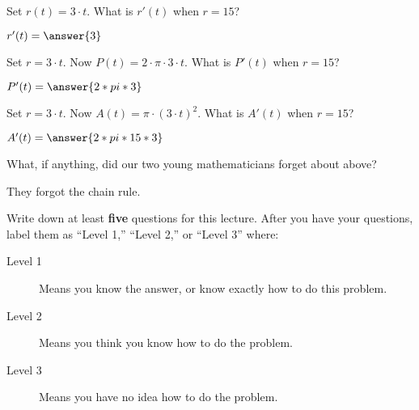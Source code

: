 \documentclass{ximera}
\begin{document}
\begin{problem}
  Set $r(t)=3\cdot t$. What is $r'(t)$ when $r=15$?
  \begin{prompt}
    $r'(t)=\answer{3}$
  \end{prompt}
\end{problem}

\begin{problem}
  Set $r=3\cdot t$. Now $P(t) = 2\cdot \pi\cdot 3\cdot t$. What is
  $P'(t)$ when $r=15$?
  \begin{prompt}
    $P'(t)=\answer{2*pi*3}$
  \end{prompt}
\end{problem}

\begin{problem}
  Set $r=3\cdot t$. Now $A(t) = \pi\cdot (3\cdot t)^2$. What is
  $A'(t)$ when $r=15$?
  \begin{prompt}
    $A'(t)=\answer{2*pi*15*3}$
  \end{prompt}
\end{problem}

\begin{problem}
  What, if anything, did our two young mathematicians forget about above?
  \begin{freeResponse}
 They forgot the chain rule.
  \end{freeResponse}
\end{problem}



\begin{xarmaBoost}
  Write down at least \textbf{five} questions for this lecture. After
  you have your questions, label them as ``Level 1,'' ``Level 2,'' or
  ``Level 3'' where:
\begin{description}
\item[Level 1] Means you know the answer, or know exactly how to do
  this problem.
\item[Level 2] Means you think you know how to do the problem.
\item[Level 3] Means you have no idea how to do the problem.
\end{description}
\begin{freeResponse}
\end{freeResponse}
\end{xarmaBoost}
\end{document}

